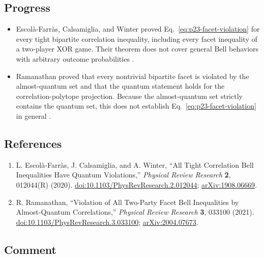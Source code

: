 \subsection*{Progress}

\begin{itemize}
  \item Escolà-Farràs, Calsamiglia, and Winter proved
  Eq.~\eqref{eq:p23-facet-violation} for every tight bipartite correlation
  inequality, including every facet inequality of a two-player XOR game.
  Their theorem does not cover general Bell behaviors with arbitrary outcome
  probabilities .

  \item Ramanathan proved that every nontrivial bipartite facet is violated by
  the almost-quantum set and that the quantum statement holds for the
  correlation-polytope projection.  Because the almost-quantum set strictly
  contains the quantum set, this does not establish
  Eq.~\eqref{eq:p23-facet-violation} in general
  .
\end{itemize}

\subsection*{References}

\begin{enumerate}[label={},leftmargin=4.8em,labelsep=0.5em]
  \footnotesize
  \item[\textup{[ECW20]}]\label{ref:p23-correlation-facets}
  L. Escolà-Farràs, J. Calsamiglia, and A. Winter,
  ``All Tight Correlation Bell Inequalities Have Quantum Violations,''
  \emph{Physical Review Research} \textbf{2}, 012044(R) (2020).
  \href{https://doi.org/10.1103/PhysRevResearch.2.012044}{doi:10.1103/PhysRevResearch.2.012044};
  \href{https://arxiv.org/abs/1908.06669}{arXiv:1908.06669}.

  \item[\textup{[Ram21]}]\label{ref:p23-almost-quantum}
  R. Ramanathan,
  ``Violation of All Two-Party Facet Bell Inequalities by Almost-Quantum
  Correlations,'' \emph{Physical Review Research} \textbf{3}, 033100 (2021).
  \href{https://doi.org/10.1103/PhysRevResearch.3.033100}{doi:10.1103/PhysRevResearch.3.033100};
  \href{https://arxiv.org/abs/2004.07673}{arXiv:2004.07673}.
\end{enumerate}

\subsection*{Comment}

